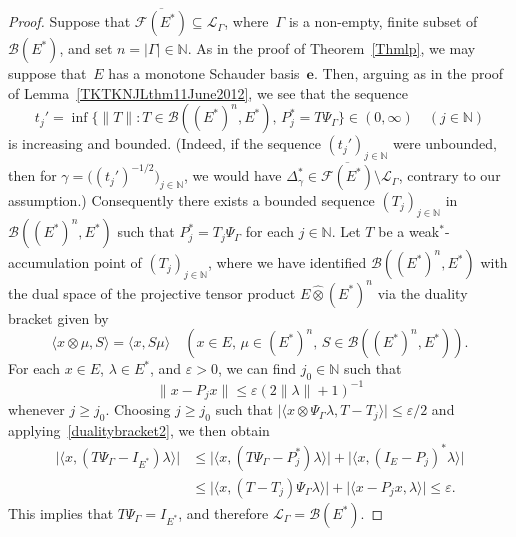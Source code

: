 \documentclass[12pt]{amsart}
\theoremstyle{definition}
\numberwithin{equation}{section}
\begin{document}
\begin{proof} 
  Suppose that
  $\overline{\mathscr{F}(E^*)}\subseteq\mathscr{L}_{\Gamma}$,
  where~$\Gamma$ is a non-empty, finite subset of~$\mathscr{B}(E^*)$,
  and set $n = |\Gamma|\in{\ensuremath{\mathbb{N}}}$. As in the proof of Theorem~\ref{Thmlp},
  we may suppose that~$E$ has a monotone Schauder
  basis~$\mathbf{e}$. Then, arguing as in the proof of
  Lemma~\ref{TKTKNJLthm11June2012}, we see that the sequence
  \[ t_j' = \inf\bigl\{\| T\| : T\in\mathscr{B}((E^*)^n,E^*),\, P_j^*
  = T\Psi_{\Gamma}\bigr\}\in(0,\infty) \quad (j\in{\ensuremath{\mathbb{N}}}) \] is increasing
  and bounded. (Indeed, if the sequence $(t_j')_{j\in{\ensuremath{\mathbb{N}}}}$ were
  unbounded, then for $\gamma = \bigl((t_j')^{-1/2}\bigr)_{j\in{\ensuremath{\mathbb{N}}}}$,
  we would have
  $\Delta_\gamma^*\in\overline{\mathscr{F}(E^*)}\setminus
  \mathscr{L}_{\Gamma}$, contrary to our assumption.)  Consequently
  there exists a bounded sequence $(T_j)_{j\in{\ensuremath{\mathbb{N}}}}$
  in~$\mathscr{B}((E^*)^n,E^*)$ such that $P_j^* = T_j\Psi_{\Gamma}$
  for each $j\in{\ensuremath{\mathbb{N}}}$. Let $T$ be a weak$^*$-accumulation point of
  $(T_j)_{j\in{\ensuremath{\mathbb{N}}}}$, where we have identified
  $\mathscr{B}((E^*)^n,E^*)$ with the dual space of the projective
  tensor product $E\widehat{\otimes}(E^*)^n$ via the duality bracket
  given by
  \begin{equation}\label{dualitybracket2} \langle x\otimes\mu, S\rangle = 
    \langle x,S\mu\rangle\quad (x\in E,\, \mu\in (E^*)^n,\,
    S\in\mathscr{B}((E^*)^n,E^*)). \end{equation} For each $x\in
  E$, $\lambda\in E^*$, and ${\ensuremath{\varepsilon}} >0$, we can find $j_0\in{\ensuremath{\mathbb{N}}}$ such
  that $$\| x - P_jx\|{\ensuremath{\leqslant}}{\ensuremath{\varepsilon}}(2\|\lambda\|+1)^{-1}$$ whenever $j{\ensuremath{\geqslant}}
  j_0$. Choosing $j{\ensuremath{\geqslant}} j_0$ such that $\bigl|\langle
  x\otimes\Psi_{\Gamma}\lambda, T- T_j\rangle\bigr|{\ensuremath{\leqslant}}{\ensuremath{\varepsilon}}/2$ and
  applying~\eqref{dualitybracket2}, we then obtain
  \begin{align*}
    \bigl|\langle x,(T\Psi_\Gamma - I_{E^*})\lambda\rangle\bigr| &{\ensuremath{\leqslant}}
    \bigl|\langle x,(T\Psi_\Gamma - P_j^*)\lambda\rangle\bigr| +
    \bigl|\langle x,(I_E-P_j)^*\lambda\rangle\bigr|\\ &{\ensuremath{\leqslant}}
    \bigl|\langle x, (T - T_j)\Psi_{\Gamma}\lambda\rangle\bigr| +
    \bigl|\langle x-P_jx,\lambda\rangle\bigr|{\ensuremath{\leqslant}}{\ensuremath{\varepsilon}}.
  \end{align*}
This implies that $T\Psi_{\Gamma} = I_{E^*}$, and therefore
$\mathscr{L}_{\Gamma} = \mathscr{B}(E^*)$.
\end{proof}
\end{document}
